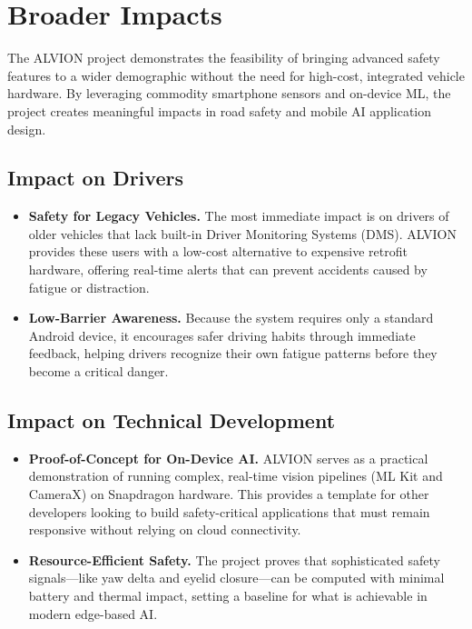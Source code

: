 \documentclass[11pt]{report}
\begin{document}
\section{Broader Impacts}\label{sec:impacts}

The ALVION project demonstrates the feasibility of bringing advanced safety features to a wider demographic without the need for high-cost, integrated vehicle hardware. By leveraging commodity smartphone sensors and on-device ML, the project creates meaningful impacts in road safety and mobile AI application design.

\subsection*{Impact on Drivers}
\begin{itemize}
    \item \textbf{Safety for Legacy Vehicles.} The most immediate impact is on drivers of older vehicles that lack built-in Driver Monitoring Systems (DMS). ALVION provides these users with a low-cost alternative to expensive retrofit hardware, offering real-time alerts that can prevent accidents caused by fatigue or distraction.
    \item \textbf{Low-Barrier Awareness.} Because the system requires only a standard Android device, it encourages safer driving habits through immediate feedback, helping drivers recognize their own fatigue patterns before they become a critical danger.
\end{itemize}

\subsection*{Impact on Technical Development}
\begin{itemize}
    \item \textbf{Proof-of-Concept for On-Device AI.} ALVION serves as a practical demonstration of running complex, real-time vision pipelines (ML Kit and CameraX) on Snapdragon hardware. This provides a template for other developers looking to build safety-critical applications that must remain responsive without relying on cloud connectivity.
    \item \textbf{Resource-Efficient Safety.} The project proves that sophisticated safety signals—like yaw delta and eyelid closure—can be computed with minimal battery and thermal impact, setting a baseline for what is achievable in modern edge-based AI.
\end{itemize}
\end{document}
